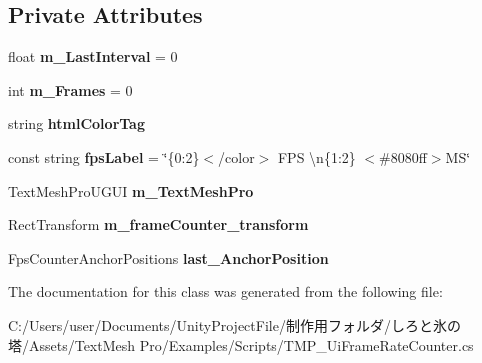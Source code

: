 \subsection*{Private Attributes}
\begin{DoxyCompactItemize}
\item 
\mbox{\label{class_t_m_pro_1_1_examples_1_1_t_m_p___ui_frame_rate_counter_aa0a4c18ac66572a39932ee051ee42347}} 
float {\bfseries m\+\_\+\+Last\+Interval} = 0
\item 
\mbox{\label{class_t_m_pro_1_1_examples_1_1_t_m_p___ui_frame_rate_counter_a15def6e4c1f2dabe6b5c09accd3214d4}} 
int {\bfseries m\+\_\+\+Frames} = 0
\item 
\mbox{\label{class_t_m_pro_1_1_examples_1_1_t_m_p___ui_frame_rate_counter_a2cbc1725e08dd5ce8128da13d638d0f8}} 
string {\bfseries html\+Color\+Tag}
\item 
\mbox{\label{class_t_m_pro_1_1_examples_1_1_t_m_p___ui_frame_rate_counter_ab8bab87cb36b2bc9965d457fb52bf000}} 
const string {\bfseries fps\+Label} = \char`\"{}\{0\+:2\}$<$/color$>$ F\+PS \textbackslash{}n\{1\+:2\} $<$\#8080ff$>$\+M\+S\char`\"{}
\item 
\mbox{\label{class_t_m_pro_1_1_examples_1_1_t_m_p___ui_frame_rate_counter_a9b8876219b8bea4c19e16a4ba44e54cd}} 
Text\+Mesh\+Pro\+U\+G\+UI {\bfseries m\+\_\+\+Text\+Mesh\+Pro}
\item 
\mbox{\label{class_t_m_pro_1_1_examples_1_1_t_m_p___ui_frame_rate_counter_a998f5fd4b12e6e65d4aa3b30bd0b946f}} 
Rect\+Transform {\bfseries m\+\_\+frame\+Counter\+\_\+transform}
\item 
\mbox{\label{class_t_m_pro_1_1_examples_1_1_t_m_p___ui_frame_rate_counter_a7a0ceaadbbe57be4da25b914b1243713}} 
Fps\+Counter\+Anchor\+Positions {\bfseries last\+\_\+\+Anchor\+Position}
\end{DoxyCompactItemize}


The documentation for this class was generated from the following file\+:\begin{DoxyCompactItemize}
\item 
C\+:/\+Users/user/\+Documents/\+Unity\+Project\+File/制作用フォルダ/しろと氷の塔/\+Assets/\+Text\+Mesh Pro/\+Examples/\+Scripts/T\+M\+P\+\_\+\+Ui\+Frame\+Rate\+Counter.\+cs\end{DoxyCompactItemize}
